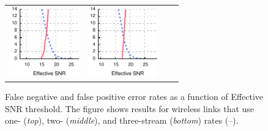 \begin{figure}[p]
\begin{xtrafullpage}
\begin{tabular}{cccc}
	\includegraphics[height=1.2in]{figures/delivery_figures/goodbad/esnr_goodbad_22.pdf} &
	\includegraphics[height=1.2in]{figures/delivery_figures/goodbad/esnr_goodbad_23.pdf}
	\end{tabular}

	\caption[Thresholds and False Negative/Positive Rates with Effective SNR]{\label{fig:esnr_goodbad}False negative and false positive error rates as a function of Effective SNR threshold. The figure shows results for wireless links that use one- (\emph{top}), two- (\emph{middle}), and three-stream (\emph{bottom}) rates (--).}
	\end{xtrafullpage}
\end{figure}

